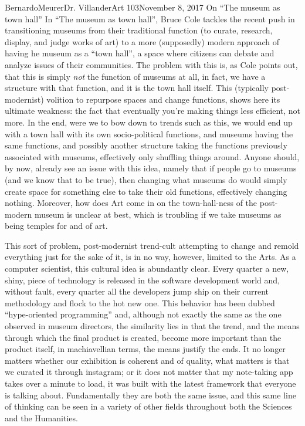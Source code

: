 \documentclass[12pt,letterpaper]{article}
\begin{document}
    \begin{mla}{Bernardo}{Meurer}{Dr. Villander}{Art 103}{November 8, 2017}%
        {On ``The museum as town hall''}
        In ``The museum as town hall'', Bruce Cole tackles the recent push in transitioning museums from their traditional function (to curate, research, display, and judge works of art) to a more (supposedly) modern approach of having he museum as a ``town hall'', a space where citizens can debate and analyze issues of their communities. The problem with this is, as Cole points out, that this is simply \emph{not} the function of museums at all, in fact, we have a structure with that function, and it is the town hall itself. This (typically post-modernist) volition to repurpose spaces and change functions, shows here its ultimate weakness: the fact that eventually you're making things less efficient, not more. In the end, were we to bow down to trends such as this, we would end up with a town hall with its own socio-political functions, and museums having the same functions, and possibly another structure taking the functions previously associated with museums, effectively only shuffling things around. Anyone should, by now, already see an issue with this idea, namely that if people go to museums (and we know that to be true), then changing what museums do would simply create space for something else to take their old functions, effectively changing nothing. Moreover, how does Art come in on the town-hall-ness of the post-modern museum is unclear at best, which is troubling if we take museums as being temples for and of art.

        This sort of problem, post-modernist trend-cult attempting to change and remold everything just for the sake of it, is in no way, however, limited to the Arts. As a computer scientist, this cultural idea is abundantly clear. Every quarter a new, shiny, piece of technology is released in the software development world and, without fault, every quarter all the developers jump ship on their current methodology and flock to the hot new one. This behavior has been dubbed ``hype-oriented programming'' and, although not exactly the same as the one observed in museum directors, the similarity lies in that the trend, and the means through which the final product is created, become more important than the product itself, in machiavellian terms, the means justify the ends. It no longer matters whether our exhibition is coherent and of quality, what matters is that we curated it through instagram; or it does not matter that my note-taking app takes over a minute to load, it was built with the latest framework that everyone is talking about. Fundamentally they are both the same issue, and this same line of thinking can be seen in a variety of other fields throughout both the Sciences and the Humanities.


\end{mla}
\end{document}
